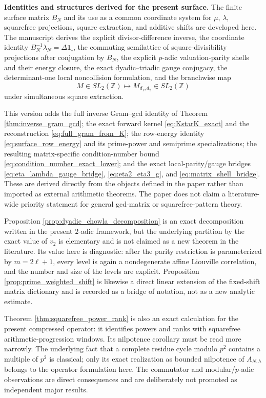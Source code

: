 \documentclass[11pt]{amsart}
\numberwithin{equation}{section}
\theoremstyle{plain}
\theoremstyle{definition}
\theoremstyle{remark}
\newcommand{\Z}{\mathbb Z}
\newcommand{\one}{\mathbf 1}
\newcommand{\mob}{\mu}
\newcommand{\liou}{\lambda}
\begin{document}
\medskip\noindent\textbf{Identities and structures derived for the present surface.}
The finite surface matrix $B_N$ and its use as a common coordinate system for $\mob$, $\liou$, squarefree projections, square extraction, and additive shifts are developed here.  The manuscript derives the explicit divisor-difference inverse, the coordinate identity $B_N^{-1}\liou_N=\Delta\one_{\square}$, the commuting semilattice of square-divisibility projections after conjugation by $B_N$, the explicit $p$-adic valuation-parity shells and their energy closure, the exact dyadic--triadic gauge conjugacy, the determinant-one local noncollision formulation, and the branchwise map
\begin{equation}
M\in SL_2(\Z)\longmapsto M_{d_1,d_2}\in SL_2(\Z)
\label{eq:provenance_SL2_map}
\end{equation}
under simultaneous square extraction.

This version adds the full inverse Gram--gcd identity of Theorem \ref{thm:inverse_gram_gcd}; the exact forward kernel \eqref{eq:KstarK_exact} and the reconstruction \eqref{eq:full_gram_from_K}; the row-energy identity \eqref{eq:surface_row_energy} and its prime-power and semiprime specializations; the resulting matrix-specific condition-number bound \eqref{eq:condition_number_exact_lower}; and the exact local-parity/gauge bridges \eqref{eq:eta_lambda_gauge_bridge}, \eqref{eq:eta2_eta3_g}, and \eqref{eq:matrix_shell_bridge}.  These are derived directly from the objects defined in the paper rather than imported as external arithmetic theorems.  The paper does not claim a literature-wide priority statement for general gcd-matrix or squarefree-pattern theory.

Proposition \ref{prop:dyadic_chowla_decomposition} is an exact decomposition written in the present $2$-adic framework, but the underlying partition by the exact value of $v_2$ is elementary and is not claimed as a new theorem in the literature.  Its value here is diagnostic: after the parity restriction is parameterized by $m=2\ell+1$, every level is again a nondegenerate affine Liouville correlation, and the number and size of the levels are explicit.  Proposition \ref{prop:prime_weighted_shift} is likewise a direct linear extension of the fixed-shift matrix dictionary and is recorded as a bridge of notation, not as a new analytic estimate.

Theorem \ref{thm:squarefree_power_rank} is also an exact calculation for the present compressed operator: it identifies powers and ranks with squarefree arithmetic-progression windows.  Its nilpotence corollary must be read more narrowly.  The underlying fact that a complete residue cycle modulo $p^2$ contains a multiple of $p^2$ is classical; only its exact realization as bounded nilpotence of $A_{N,h}$ belongs to the operator formulation here.  The commutator and modular/$p$-adic observations are direct consequences and are deliberately not promoted as independent major results.
\end{document}
